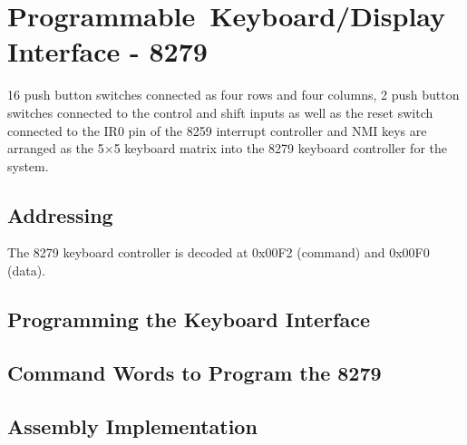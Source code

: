 \section{Programmable Keyboard/Display Interface - 8279}
16 push button switches connected as four rows and four columns, 2 push button switches connected to the control and shift inputs as well as the reset switch connected to the IR0 pin of the 8259 interrupt controller and NMI keys are arranged as the 5$\times$5 keyboard matrix into the 8279 keyboard controller for the system.

    \subsection{Addressing}
    The 8279 keyboard controller is decoded at 0x00F2 (command) and 0x00F0 (data).

    \subsection{Programming the Keyboard Interface}

    \subsection{Command Words to Program the 8279}

    \subsection{Assembly Implementation}
